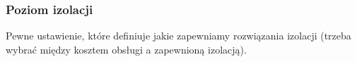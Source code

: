 \documentclass[12pt]{article}
\begin{document}
\subsubsection{Poziom izolacji}
Pewne ustawienie, które definiuje jakie zapewniamy rozwiązania izolacji (trzeba
wybrać między kosztem obsługi a zapewnioną izolacją).

\begin{comment}
\begin{itemize}
  \item transakcje to programy
  \item możliwe różne uszeregowanie operacji
  \item trudno analizować czy transakcje zależą od siebie czy nie
  \item ograniczamy tą analizę do READ i WRITE
\end{itemize}

Przykład:
  T1:
    1. READ(A)
    2. A = A + 100
    3. WRITE(A)
    4. READ(B)
    5. B = B + 100
    6. WRITE(B)

  T2:
    1. READ(A)
    2. A = A * 2
    3. WRITE(A)
    4. READ(B)
    5. B = B * 2
    6. WRITE(B)

  CONSTRAINT A == B

  * transakcje wykonywane w kolejności T1, T2 -- zapewniony constraint
  * kolejność T2, T1 -- zapewniony constraint ale \emph{inny wynik}
  * T1.1, T1.2, T1.3, T2.1, T2.2, T2.3, T1.4, T1.5, T1.6, T2.4, T2.5, T2.6 -- wynik okej
  * T1.{1-3}, T2.{1-6}, T1.{4-6} -- nie spełniona integralność
  * to co powyzej ale mnozenie razy 1 -- spełniona integralność

  Które są dobre? (niezależnie od danych wejściowych i operacji w transakcji)

Koniec przykładu.

Rozwiązywanie problemu izolacji:

1. Wyróżniamy transkacje READ i WRITE w transakcji (szeregowalność konfliktów)
\begin{itemize}
\item jeżeli instrukcje odnoszą się do różnych danych to można je zamienić miejscami
\item jeżeli odnoszą się do tych samych danych i przynajmniej jedna jest WRITEt to jest \emph{konflikt}
\end{itemize}

Uszeregowanie S:
 * I_i, I_j -- dwie kolejne instrukcje
 * jeśli nie są w konflikcie to można je zamienić
 * dostajemy uszregowanie S'
 * S i S' są równoważne
 * S' jest serializowalny, szeregowalny -- daje te same wyniki
Definicja: plany są równoważne ?
Definicja: plan szeregowalny: plan jest szregowalny ze wzgłedy na konflikt jesśli jest on zgodny z planem
seryjnym (sekwencyjnym)


\end{comment}
\end{document}
